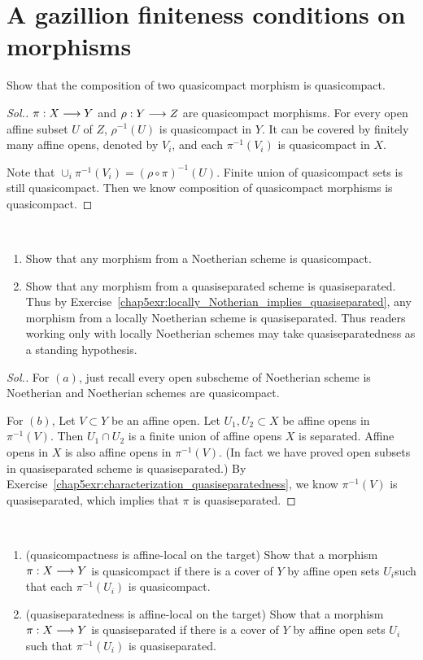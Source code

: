 \documentclass[11pt]{book} %
\begin{document}
\section{A gazillion finiteness conditions on morphisms}
\begin{exr}
Show that the composition of two quasicompact morphism is quasicompact.
\end{exr}
\begin{proof}[Sol.]
$\pi:X\longrightarrow Y$ and $\rho:Y\longrightarrow Z$ are quasicompact morphisms. For every open affine subset $U$ of $Z$, $\rho^{-1}(U)$ is quasicompact in $Y$. It can be covered by finitely many affine opens, denoted by $V_i$, and each $\pi^{-1}(V_i)$ is quasicompact in $X$.

Note that $\cup_i \pi^{-1}(V_i)=(\rho\circ \pi)^{-1}(U)$. Finite union of quasicompact sets is still quasicompact. Then we know composition of quasicompact morphisms is quasicompact.
\end{proof}
\begin{exr}\label{chap7exr:7.3.B}\ 
\begin{enumerate}[label=(\alph*)]
\item Show that any morphism from a Noetherian scheme is quasicompact.
\item Show that any morphism from a quasiseparated scheme is quasiseparated. Thus by Exercise~\ref{chap5exr:locally_Notherian_implies_quasiseparated}, any morphism from a locally Noetherian scheme is quasiseparated. Thus readers working only with locally Noetherian schemes may take quasiseparatedness as a standing hypothesis.
\end{enumerate}
\end{exr}
\begin{proof}[Sol.]
For $(a)$, just recall every open subscheme of Noetherian scheme is Noetherian and Noetherian schemes are quasicompact.

For $(b)$, Let $V\subset Y$ be an affine open. Let $U_1,U_2\subset X$ be affine opens in $\pi^{-1}(V)$. Then $U_1\cap U_2$ is a finite union of affine opens $X$ is separated. Affine opens in $X$ is also affine opens in $\pi^{-1}(V)$. (In fact  we have proved open subsets in quasiseparated scheme is quasiseparated.) By Exercise~\ref{chap5exr:characterization_quasiseparatedness}, we know $\pi^{-1}(V)$ is quasiseparated, which implies that $\pi$ is quasiseparated.
\end{proof}
\begin{exr}\ 
\begin{enumerate}[label=(\alph*)]
\item  (quasicompactness is affine-local on the target) Show that a morphism $\pi:X\longrightarrow Y$ is quasicompact if there is a cover of $Y$ by affine open sets $U_i $such that each $\pi^{-1}(U_i)$ is quasicompact.
\item (quasiseparatedness is affine-local on the target) Show that a morphism $\pi: X \longrightarrow Y$ is quasiseparated if there is a cover of $Y$ by affine open sets $U_i$ such that $\pi^{-1}(U_i)$ is quasiseparated.
\end{enumerate}
\end{exr}
\end{document}
